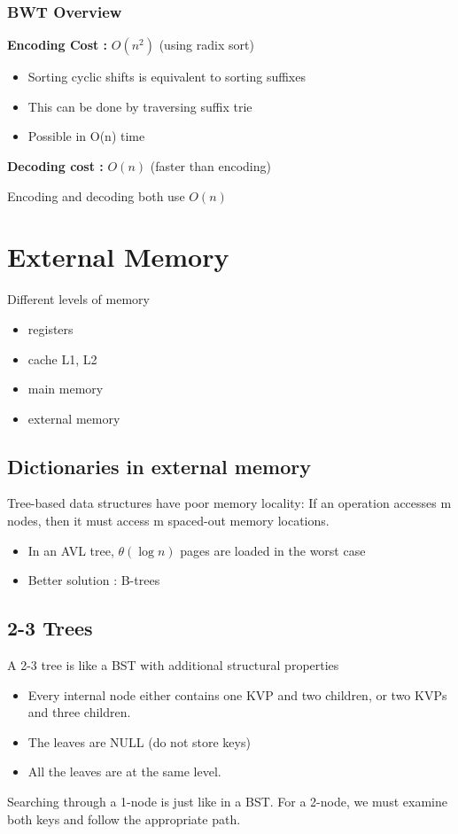 \documentclass{article}
\begin{document}
\subsubsection*{BWT Overview}
\textbf{Encoding Cost :} \(O(n^2)\) (using radix sort)
\begin{itemize}
\item Sorting cyclic shifts is equivalent to sorting suffixes
\item This can be done by traversing suffix trie
\item Possible in O(n) time
\end{itemize}
\textbf{Decoding cost :} \(O(n)\) (faster than encoding) 


Encoding and decoding both use \(O(n)\)


\section{External Memory}

Different levels of memory
\begin{itemize}
\item registers
\item cache L1, L2
\item main memory 
\item external memory 
\end{itemize}

\subsection*{Dictionaries in external memory}
Tree-based data structures have poor memory locality:
If an operation accesses m nodes, then it must access
m spaced-out memory locations.
\begin{itemize}
\item In an AVL tree, \(\theta(\log n)\) pages are loaded in the worst case
\item Better solution : B-trees
\end{itemize}

\subsection*{2-3 Trees}
A 2-3 tree is like a BST with additional structural properties 
\begin{itemize}
\item Every internal node either contains one KVP and two children,
or two KVPs and three children.
\item The leaves are NULL (do not store keys)
\item All the leaves are at the same level.
\end{itemize} 
Searching through a 1-node is just like in a BST.
For a 2-node, we must examine both keys and follow the appropriate path.
\end{document}
